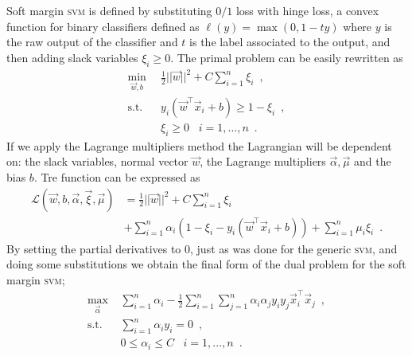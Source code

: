 Soft margin \textsc{svm} is defined by substituting $0/1$ loss with hinge loss, a convex function for binary classifiers defined as $\ell(y) = \max(0, 1 - ty)$ where $y$ is the raw output of the classifier and $t$ is the label associated to the output, and then adding slack variables $\xi_i \geq 0$. The primal problem can be easily rewritten as
\begin{equation}
	\label{eq:sm-primal-final}
	\begin{aligned}
		\min_{\vec{w}, b}         & \frac{1}{2}||\vec{w}||^2 + C\sum_{i = 1}^n \xi_i
		\enspace,\\
		\text{s.t.} \hspace{10pt} & y_i(\vec{w}^\top\vec{x}_i + b) \geq 1 - \xi_i \enspace,    \\
		                          & \xi_i \geq 0 \hspace{10pt}i = 1, \ldots, n \enspace.
	\end{aligned}
\end{equation}
If we apply the Lagrange multipliers method the Lagrangian will be dependent on: the slack
variables, normal vector $\vec{w}$, the Lagrange multipliers $\vec{\alpha}, \vec{\mu}$ and the bias $b$. Tre function can be expressed as
\begin{equation}
	\label{eq:sm-lagrangian}
	\begin{aligned}
		\mathcal{L}(\vec{w}, b, \vec{\alpha}, \vec{\xi}, \vec{\mu}) & =
		\frac{1}{2}||\vec{w}||^2 + C\sum_{i = 1}^n \xi_i                                                                                                               \\
		& + \sum_{i = 1}^n \alpha_i(1 - \xi_i - y_i(\vec{w}^\top\vec{x}_i + b))
		  + \sum_{i = 1}^n\mu_i\xi_i \enspace.
	\end{aligned}
\end{equation}
By setting the partial derivatives to $0$, just as was done for the generic \textsc{svm}, and doing
some substitutions we obtain the final form of the dual problem for the soft margin \textsc{svm};
\begin{equation}
	\label{eq:sm-dual-final}
	\begin{aligned}
		\max_{\vec{\alpha}}       & \sum_{i = 1}^n \alpha_i - \frac{1}{2}\sum_{i = 1}^n\sum_{j =
		1}^n\alpha_i\alpha_jy_iy_j\vec{x}_i^\top\vec{x}_j \enspace,                                        \\
		\text{s.t.} \hspace{10pt} & \sum_{i = 1}^n\alpha_iy_i = 0 \enspace,                              \\
		                          & 0 \leq \alpha_i \leq C \hspace{10pt} i = 1, \ldots, n
					  \enspace.
	\end{aligned}
\end{equation}
